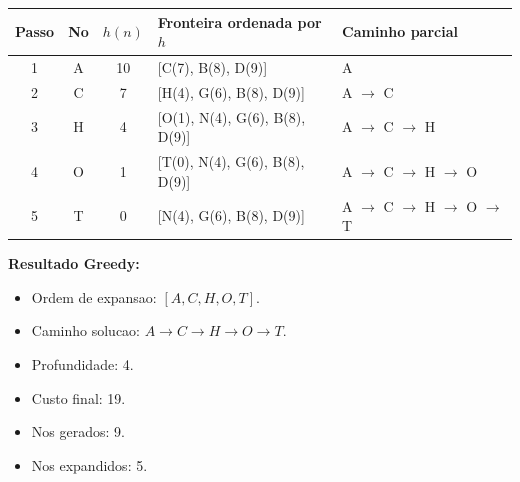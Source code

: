 \begin{longtable}{c c c p{5.2cm} p{3.4cm}}
\toprule
Passo & No & $h(n)$ & Fronteira ordenada por $h$ & Caminho parcial \\
\midrule
1 & A & 10 & [C(7), B(8), D(9)] & A \\
2 & C & 7 & [H(4), G(6), B(8), D(9)] & A $\rightarrow$ C \\
3 & H & 4 & [O(1), N(4), G(6), B(8), D(9)] & A $\rightarrow$ C $\rightarrow$ H \\
4 & O & 1 & [T(0), N(4), G(6), B(8), D(9)] & A $\rightarrow$ C $\rightarrow$ H $\rightarrow$ O \\
5 & T & 0 & [N(4), G(6), B(8), D(9)] & A $\rightarrow$ C $\rightarrow$ H $\rightarrow$ O $\rightarrow$ T \\
\bottomrule
\end{longtable}

\textbf{Resultado Greedy:}
\begin{itemize}[leftmargin=1.5em]
  \item Ordem de expansao: $[A,C,H,O,T]$.
  \item Caminho solucao: $A \rightarrow C \rightarrow H \rightarrow O \rightarrow T$.
  \item Profundidade: 4.
  \item Custo final: 19.
  \item Nos gerados: 9.
  \item Nos expandidos: 5.
\end{itemize}

